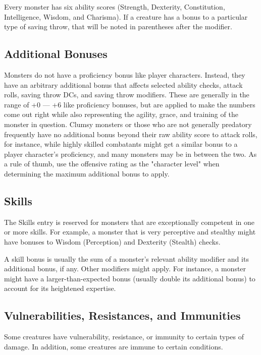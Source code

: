 Every monster has six ability scores (Strength, Dexterity, Constitution, Intelligence, Wisdom, and Charisma). If a creature has a bonus to a particular type of saving throw, that will be noted in parentheses after the modifier.

\subsection{Additional Bonuses}

Monsters do not have a proficiency bonus like player characters. Instead, they have an arbitrary additional bonus that affects selected ability checks, attack rolls, saving throw DCs, and saving throw modifiers. These are generally in the range of +0 --- +6 like proficiency bonuses, but are applied to make the numbers come out right while also representing the agility, grace, and training of the monster in question. Clumsy monsters or those who are not generally predatory frequently have no additional bonus beyond their raw ability score to attack rolls, for instance, while highly skilled combatants might get a similar bonus to a player character's proficiency, and many monsters may be in between the two. As a rule of thumb, use the offensive rating as the "character level" when determining the maximum additional bonus to apply.
              
\subsection{Skills}

The Skills entry is reserved for monsters that are exceptionally competent in one or more skills. For example, a monster that is very perceptive and stealthy might have bonuses to Wisdom (Perception) and Dexterity (Stealth) checks.

A skill bonus is usually the sum of a monster's relevant ability modifier and its additional bonus, if any. Other modifiers might apply. For instance, a monster might have a larger-than-expected bonus (usually double its additional bonus) to account for its heightened expertise.

\subsection{Vulnerabilities, Resistances, and Immunities}

Some creatures have vulnerability, resistance, or immunity to certain types of damage. In addition, some creatures are immune to certain conditions.

